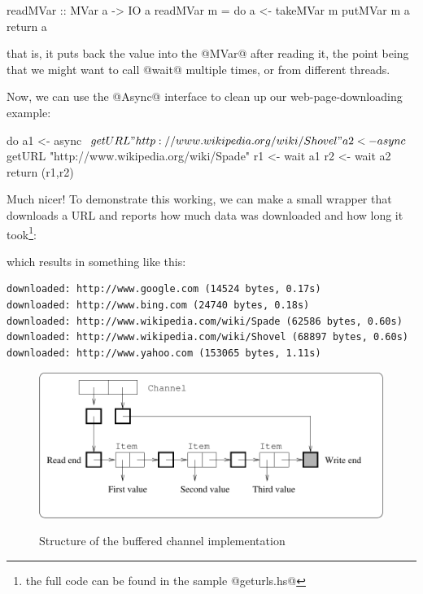 \begin{haskell}
readMVar :: MVar a -> IO a
readMVar m = do
  a <- takeMVar m
  putMVar m a
  return a
\end{haskell}

\noindent that is, it puts back the value into the @MVar@ after
reading it, the point being that we might want to call @wait@ multiple
times, or from different threads.

Now, we can use the @Async@ interface to clean up our
web-page-downloading example:

\begin{numhaskell}
do
   a1 <- async $ getURL "http://www.wikipedia.org/wiki/Shovel"
   a2 <- async $ getURL "http://www.wikipedia.org/wiki/Spade"
   r1 <- wait a1
   r2 <- wait a2
   return (r1,r2)
\end{numhaskell}

Much nicer!  To demonstrate this working, we can make a small wrapper
that downloads a URL and reports how much data was downloaded and how
long it took\footnote{the full code can be found in the sample @geturls.hs@}:


\noindent which results in something like this:

{\small
\begin{verbatim}
downloaded: http://www.google.com (14524 bytes, 0.17s)
downloaded: http://www.bing.com (24740 bytes, 0.18s)
downloaded: http://www.wikipedia.com/wiki/Spade (62586 bytes, 0.60s)
downloaded: http://www.wikipedia.com/wiki/Shovel (68897 bytes, 0.60s)
downloaded: http://www.yahoo.com (153065 bytes, 1.11s)
\end{verbatim}
}

\begin{figure}
\includegraphics[scale=0.8]{channel.pdf}
\label{fig:channels}
\caption{Structure of the buffered channel implementation}
\end{figure}

